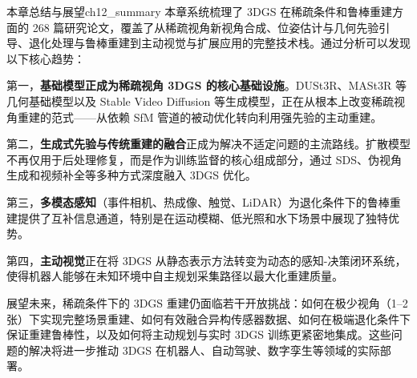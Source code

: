 \begin{futurebox}{本章总结与展望}{ch12_summary}
本章系统梳理了 3DGS 在稀疏条件和鲁棒重建方面的 268 篇研究论文，覆盖了从稀疏视角新视角合成、位姿估计与几何先验引导、退化处理与鲁棒重建到主动视觉与扩展应用的完整技术栈。通过分析可以发现以下核心趋势：

第一，\textbf{基础模型正成为稀疏视角 3DGS 的核心基础设施}。DUSt3R、MASt3R 等几何基础模型以及 Stable Video Diffusion 等生成模型，正在从根本上改变稀疏视角重建的范式——从依赖 SfM 管道的被动优化转向利用强先验的主动重建。

第二，\textbf{生成式先验与传统重建的融合}正成为解决不适定问题的主流路线。扩散模型不再仅用于后处理修复，而是作为训练监督的核心组成部分，通过 SDS、伪视角生成和视频补全等多种方式深度融入 3DGS 优化。

第三，\textbf{多模态感知}（事件相机、热成像、触觉、LiDAR）为退化条件下的鲁棒重建提供了互补信息通道，特别是在运动模糊、低光照和水下场景中展现了独特优势。

第四，\textbf{主动视觉}正在将 3DGS 从静态表示方法转变为动态的感知-决策闭环系统，使得机器人能够在未知环境中自主规划采集路径以最大化重建质量。

展望未来，稀疏条件下的 3DGS 重建仍面临若干开放挑战：如何在极少视角（1--2 张）下实现完整场景重建、如何有效融合异构传感器数据、如何在极端退化条件下保证重建鲁棒性，以及如何将主动规划与实时 3DGS 训练更紧密地集成。这些问题的解决将进一步推动 3DGS 在机器人、自动驾驶、数字孪生等领域的实际部署。
\end{futurebox}
